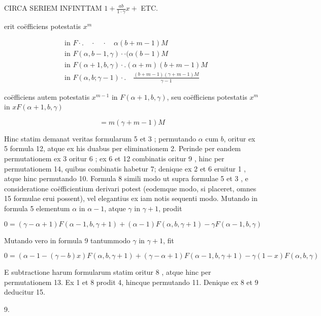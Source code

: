 \documentclass[10pt]{article}
\begin{document}
CIRCA SERIEM INFINTTAM \(1+\frac{a b}{1 \cdot \gamma} x+\) ETC.

erit coëfficiens potestatis \(x^{m}\)

\[
\begin{aligned}
& \text { in } F \cdot . \quad \cdot \quad \cdot \quad \alpha(b+m-1) M \\
& \text { in } F(\alpha, b-1, \gamma) \cdot \cdot(\alpha(b-1) M \\
& \text { in } F(\alpha+1, b, \gamma) \cdot .(\alpha+m)(b+m-1) M \\
& \text { in } F(\alpha, b ; \gamma-1) \cdot . \quad \frac{(b+m-1)(\gamma+m-1) M}{\gamma-1}
\end{aligned}
\]

coëfficiens autem potestatis \(x^{m-1}\) in \(F(\alpha+1, b, \gamma)\), seu coëfficiens potestatis \(x^{m}\) in \(x F(\alpha+1, b, \gamma)\)

\[
=m(\gamma+m-1) M
\]

Hinc statim demanat veritas formularum 5 et 3 ; permutando \(\alpha\) cum \(b\), oritur ex 5 formula 12, atque ex his duabus per eliminationem 2. Perinde per eandem permutationem ex 3 oritur 6 ; ex 6 et 12 combinatis oritur 9 , hinc per permutationem 14, quibus combinatis habetur 7; denique ex 2 et 6 eruitur 1 , atque hinc permutando 10. Formula 8 simili modo ut supra formulae 5 et 3 , e consideratione coëfficientium derivari potest (eodemque modo, si placeret, omnes 15 formulae erui possent), vel elegantius ex iam notis sequenti modo. Mutando in formula 5 elementum \(\alpha\) in \(\alpha-1\), atque \(\gamma\) in \(\gamma+1\), prodit

\[
0=(\gamma-\alpha+1) F(\alpha-1, b, \gamma+1)+(\alpha-1) F(\alpha, b, \gamma+1)-\gamma F(\alpha-1, b, \gamma)
\]

Mutando vero in formula 9 tantummodo \(\gamma\) in \(\gamma+1\), fit

\(0=(\alpha-1-(\gamma-b) x) F(\alpha, b, \gamma+1)+(\gamma-\alpha+1) F(\alpha-1, b, \gamma+1)-\gamma(1-x) F(\alpha, b, \gamma)\)

E subtractione harum formularum statim oritur 8 , atque hinc per permutationem 13. Ex 1 et 8 prodit 4, hincque permutando 11. Denique ex 8 et 9 deducitur 15.

9.
\end{document}
